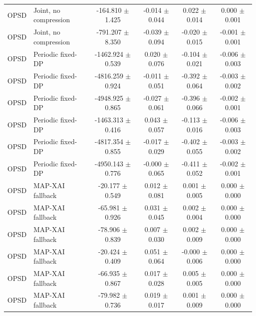 \begin{tabular}{llcccc}
OPSD & Joint, no compression & -164.810 $\pm$ 1.425 & -0.014 $\pm$ 0.044 & 0.022 $\pm$ 0.014 & 0.000 $\pm$ 0.001 \\
OPSD & Joint, no compression & -791.207 $\pm$ 8.350 & -0.039 $\pm$ 0.094 & -0.020 $\pm$ 0.015 & -0.001 $\pm$ 0.001 \\
OPSD & Periodic fixed-DP & -1462.924 $\pm$ 0.539 & 0.020 $\pm$ 0.076 & -0.104 $\pm$ 0.021 & -0.006 $\pm$ 0.003 \\
OPSD & Periodic fixed-DP & -4816.259 $\pm$ 0.924 & -0.011 $\pm$ 0.051 & -0.392 $\pm$ 0.064 & -0.003 $\pm$ 0.002 \\
OPSD & Periodic fixed-DP & -4948.925 $\pm$ 0.865 & -0.027 $\pm$ 0.061 & -0.396 $\pm$ 0.066 & -0.002 $\pm$ 0.001 \\
OPSD & Periodic fixed-DP & -1463.313 $\pm$ 0.416 & 0.043 $\pm$ 0.057 & -0.113 $\pm$ 0.016 & -0.006 $\pm$ 0.003 \\
OPSD & Periodic fixed-DP & -4817.354 $\pm$ 0.855 & -0.017 $\pm$ 0.029 & -0.402 $\pm$ 0.055 & -0.003 $\pm$ 0.002 \\
OPSD & Periodic fixed-DP & -4950.143 $\pm$ 0.776 & -0.000 $\pm$ 0.065 & -0.411 $\pm$ 0.052 & -0.002 $\pm$ 0.001 \\
OPSD & MAP-XAI fallback & -20.177 $\pm$ 0.549 & 0.012 $\pm$ 0.081 & 0.001 $\pm$ 0.005 & 0.000 $\pm$ 0.000 \\
OPSD & MAP-XAI fallback & -65.981 $\pm$ 0.926 & 0.031 $\pm$ 0.045 & 0.002 $\pm$ 0.004 & 0.000 $\pm$ 0.000 \\
OPSD & MAP-XAI fallback & -78.906 $\pm$ 0.839 & 0.007 $\pm$ 0.030 & 0.002 $\pm$ 0.009 & 0.000 $\pm$ 0.000 \\
OPSD & MAP-XAI fallback & -20.424 $\pm$ 0.409 & 0.051 $\pm$ 0.064 & -0.000 $\pm$ 0.006 & 0.000 $\pm$ 0.000 \\
OPSD & MAP-XAI fallback & -66.935 $\pm$ 0.867 & 0.017 $\pm$ 0.028 & 0.005 $\pm$ 0.005 & 0.000 $\pm$ 0.000 \\
OPSD & MAP-XAI fallback & -79.982 $\pm$ 0.736 & 0.019 $\pm$ 0.017 & 0.001 $\pm$ 0.009 & 0.000 $\pm$ 0.000 \\
\bottomrule
\end{tabular}
